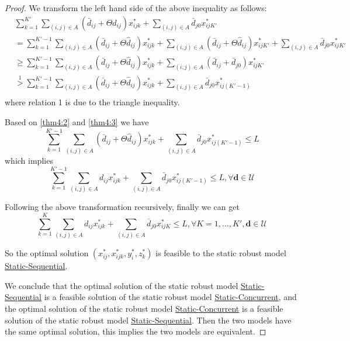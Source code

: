 \documentclass[preprint,review,10pt,round,authoryear]{elsarticle}\usepackage[]{graphicx}\usepackage[]{color}
\theoremstyle{plain}
\theoremstyle{definition}
\theoremstyle{remark}
\begin{document}
\begin{proof}
We transform the left hand side of the above inequality as follows:
\begin{equation}
\begin{aligned}
&\sum_{k=1}^{K'}\sum_{(i,j)\in A}(\bar{d}_{ij}+\Theta\hat{d}_{ij})x^*_{ijk} + \sum_{(i,j)\in A}\bar{d}_{j0}x^*_{ijK'} \\
&=\sum_{k=1}^{K'-1}\sum_{(i,j)\in A}(\bar{d}_{ij}+\Theta\hat{d}_{ij})x^*_{ijk}+\sum_{(i,j)\in A}(\bar{d}_{ij}+\Theta\hat{d}_{ij})x^*_{ijK'} + \sum_{(i,j)\in A}\bar{d}_{j0}x^*_{ijK'}\\
&\geq\sum_{k=1}^{K'-1}\sum_{(i,j)\in A}(\bar{d}_{ij}+\Theta\hat{d}_{ij})x^*_{ijk}+\sum_{(i,j)\in A}(\bar{d}_{ij}+\bar{d}_{j0})x^*_{ijK'}\\
&\overset{1}{>} \sum_{k=1}^{K'-1}\sum_{(i,j)\in A}(\bar{d}_{ij}+\Theta\hat{d}_{ij})x^*_{ijk} + \sum_{(i,j)\in A}\bar{d}_{j0}x^*_{ij(K'-1)}\\
\end{aligned}
\label{thm4:3}
\end{equation}
where relation 1 is due to the triangle inequality.

Based on \eqref{thm4:2} and \eqref{thm4:3} we have 
\begin{equation}
\sum_{k=1}^{K'-1}\sum_{(i,j)\in A}(\bar{d}_{ij}+\Theta\hat{d}_{ij})x^*_{ijk} + \sum_{(i,j)\in A}\bar{d}_{j0}x^*_{ij(K'-1)} \leq L
\end{equation}
which implies 
\begin{equation}
\sum_{k=1}^{K'-1}\sum_{(i,j)\in A}d_{ij}x^*_{ijk} + \sum_{(i,j)\in A}\bar{d}_{j0}x^*_{ij(K'-1)} \leq L,\forall \mathbf{d}\in\mathcal{U}
\end{equation}

Following the above transformation recursively, finally we can get 
\begin{equation}
\sum_{k=1}^{K}\sum_{(i,j)\in A}d_{ij}x^*_{ijk} + \sum_{(i,j)\in A}\bar{d}_{j0}x^*_{ijK} \leq L,\forall K=1,...,K', \mathbf{d}\in\mathcal{U}
\end{equation}

So the optimal solution $(x_{ij}^*,x_{ijk}^*,y_i^*,z_k^*)$ is feasible to the static robust model  \hyperref[sro:1]{Static-Sequential}.

We conclude that the optimal solution of the static robust model \hyperref[sro:1]{Static-Sequential} is a feasible solution of the static robust model \hyperref[sro:2]{Static-Concurrent}, and the optimal solution of the static robust model \hyperref[sro:2]{Static-Concurrent} is a feasible solution of the static robust model \hyperref[sro:1]{Static-Sequential}. Then the two models have the same optimal solution, this implies the two models are equivalent.
\end{proof}
\end{document}
